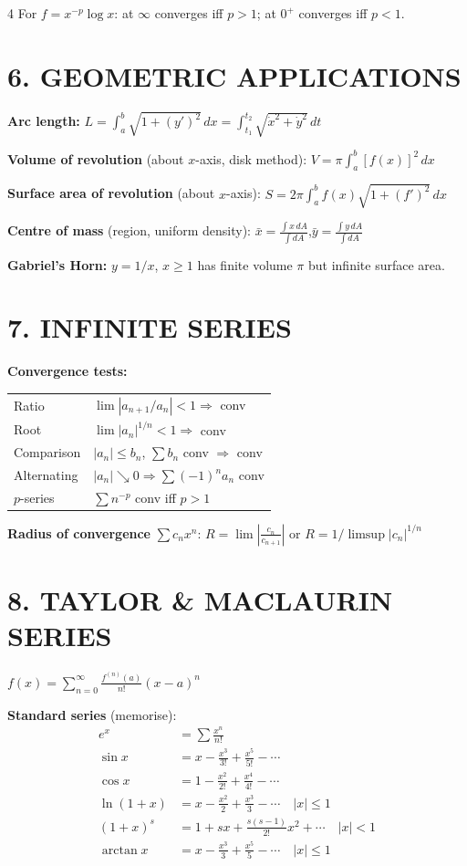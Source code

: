 \documentclass[8pt,a4paper,landscape]{extarticle}
\newcommand{\dx}{\,dx}
\begin{document}
\begin{multicols}{4}
For $f=x^{-p}\log x$: at $\infty$ converges iff $p>1$; at $0^+$ converges iff $p<1$.

\section*{6. GEOMETRIC APPLICATIONS}

\textbf{Arc length:}
$L=\int_a^b\sqrt{1+(y')^2}\dx=\int_{t_1}^{t_2}\sqrt{\dot x^2+\dot y^2}\,dt$

\textbf{Volume of revolution} (about $x$-axis, disk method):
$V=\pi\int_a^b [f(x)]^2\dx$

\textbf{Surface area of revolution} (about $x$-axis):
$S=2\pi\int_a^b f(x)\sqrt{1+(f')^2}\dx$

\textbf{Centre of mass} (region, uniform density):
$\bar x=\frac{\int x\,dA}{\int dA}$,\quad $\bar y=\frac{\int y\,dA}{\int dA}$

\textbf{Gabriel's Horn:} $y=1/x$, $x\geq1$ has finite volume $\pi$ but infinite surface area.

\section*{7. INFINITE SERIES}

\textbf{Convergence tests:}

\begin{tabular}{@{}ll@{}}
Ratio & $\lim|a_{n+1}/a_n|<1\Rightarrow$ conv \\
Root & $\lim|a_n|^{1/n}<1\Rightarrow$ conv \\
Comparison & $|a_n|\leq b_n$, $\sum b_n$ conv $\Rightarrow$ conv \\
Alternating & $|a_n|\searrow0\Rightarrow\sum(-1)^na_n$ conv \\
$p$-series & $\sum n^{-p}$ conv iff $p>1$ \\
\end{tabular}

\textbf{Radius of convergence} $\sum c_n x^n$:
$R=\lim\left|\frac{c_n}{c_{n+1}}\right|$ or $R=1/\limsup|c_n|^{1/n}$

\section*{8. TAYLOR \& MACLAURIN SERIES}

$f(x)=\sum_{n=0}^\infty\frac{f^{(n)}(a)}{n!}(x-a)^n$

\textbf{Standard series} (memorise):
\begin{align*}
e^x&=\sum\frac{x^n}{n!}\\
\sin x&=x-\frac{x^3}{3!}+\frac{x^5}{5!}-\cdots\\
\cos x&=1-\frac{x^2}{2!}+\frac{x^4}{4!}-\cdots\\
\ln(1+x)&=x-\frac{x^2}{2}+\frac{x^3}{3}-\cdots\quad|x|\leq1\\
(1+x)^s&=1+sx+\frac{s(s-1)}{2!}x^2+\cdots\quad|x|<1\\
\arctan x&=x-\frac{x^3}{3}+\frac{x^5}{5}-\cdots\quad|x|\leq1
\end{align*}


\end{multicols}
\end{document}
